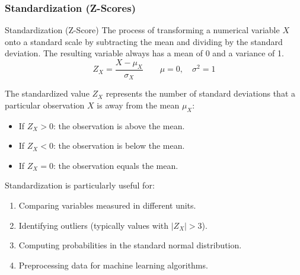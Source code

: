 \subsubsection{Standardization (Z-Scores)}

\begin{defbox}{Standardization (Z-Score)}
The process of transforming a numerical variable $X$ onto a standard scale by subtracting the mean and dividing by the standard deviation. The resulting variable always has a mean of 0 and a variance of 1.
\begin{equation}
    Z_X = \frac{X - \mu_X}{\sigma_X} \qquad \mu = 0, \quad  \sigma^2=1
\end{equation}
\end{defbox}


The standardized value $Z_X$ represents the number of standard deviations that a particular observation $X$ is away from the mean $\mu_X$:
\begin{itemize}
 \item If $Z_X > 0$: the observation is above the mean.
 \item If $Z_X < 0$: the observation is below the mean.
 \item If $Z_X = 0$: the observation equals the mean.
\end{itemize}

Standardization is particularly useful for:
\begin{enumerate}
 \item Comparing variables measured in different units.
 \item Identifying outliers (typically values with $|Z_X| > 3$).
 \item Computing probabilities in the standard normal distribution.
 \item Preprocessing data for machine learning algorithms.
\end{enumerate}


